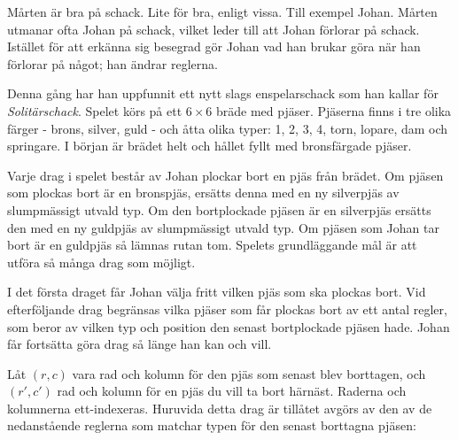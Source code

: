 Mårten är bra på schack. Lite för bra, enligt vissa. Till exempel Johan. Mårten utmanar ofta Johan på schack,
vilket leder till att Johan förlorar på schack. Istället för att erkänna sig besegrad gör Johan vad han
brukar göra när han förlorar på något; han ändrar reglerna.

Denna gång har han uppfunnit ett nytt slags enspelarschack som han kallar för \emph{Solitärschack}. Spelet
körs på ett $6 \times 6$ bräde med pjäser. Pjäserna finns i tre olika färger - brons, silver, guld - och
åtta olika typer: 1, 2, 3, 4, torn, lopare, dam och springare. I början är brädet helt och hållet fyllt med bronsfärgade pjäser.

Varje drag i spelet består av Johan plockar bort en pjäs från brädet. Om pjäsen som plockas bort är en bronspjäs,
ersätts denna med en ny silverpjäs av slumpmässigt utvald typ. Om den bortplockade pjäsen är en silverpjäs ersätts den
med en ny guldpjäs av slumpmässigt utvald typ. Om pjäsen som Johan tar bort är en guldpjäs så lämnas rutan tom.
Spelets grundläggande mål är att utföra så många drag som möjligt.

I det första draget får Johan välja fritt vilken pjäs som ska plockas bort. Vid efterföljande drag begränsas vilka pjäser
som får plockas bort av ett antal regler, som beror av vilken typ och position den senast bortplockade pjäsen hade. Johan
får fortsätta göra drag så länge han kan och vill.

Låt $(r, c)$ vara rad och kolumn för den pjäs som senast blev borttagen, och $(r', c')$ rad och kolumn för en
pjäs du vill ta bort härnäst. Raderna och kolumnerna ett-indexeras. Huruvida detta drag är tillåtet avgörs av
den av de nedanstående reglerna som matchar typen för den senast borttagna pjäsen:

